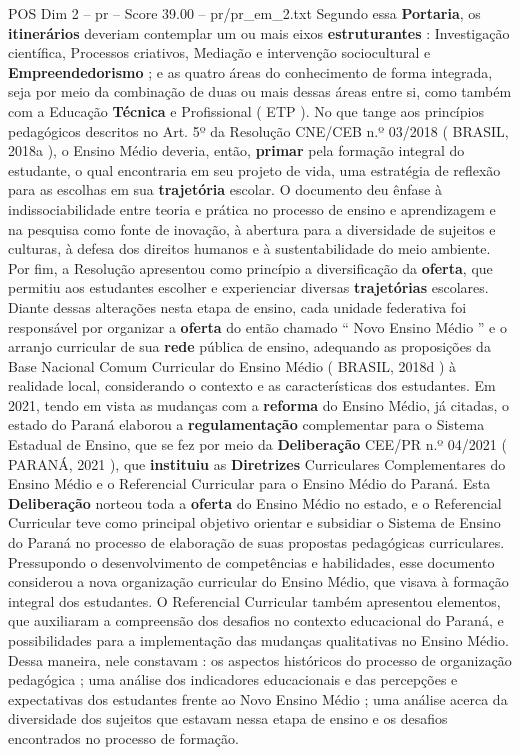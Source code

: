 \begin{textsample}{POS Dim 2 – pr – Score 39.00 – pr/pr\_em\_2.txt}
Segundo essa \textbf{Portaria}, os \textbf{itinerários} deveriam contemplar um ou mais eixos \textbf{estruturantes} : Investigação científica, Processos criativos, Mediação e intervenção sociocultural e \textbf{Empreendedorismo} ; e as quatro áreas do conhecimento de forma integrada, seja por meio da combinação de duas ou mais dessas áreas entre si, como também com a Educação \textbf{Técnica} e Profissional ( ETP ).
No que tange aos princípios pedagógicos descritos no Art. 5º da Resolução CNE/CEB n.º 03/2018 ( BRASIL, 2018a ), o Ensino Médio deveria, então, \textbf{primar} pela formação integral do estudante, o qual encontraria em seu projeto de vida, uma estratégia de reflexão para as escolhas em sua \textbf{trajetória} escolar.
O documento deu ênfase à indissociabilidade entre teoria e prática no processo de ensino e aprendizagem e na pesquisa como fonte de inovação, à abertura para a diversidade de sujeitos e culturas, à defesa dos direitos humanos e à sustentabilidade do meio ambiente.
Por fim, a Resolução apresentou como princípio a diversificação da \textbf{oferta}, que permitiu aos estudantes escolher e experienciar diversas \textbf{trajetórias} escolares.
Diante dessas alterações nesta etapa de ensino, cada unidade federativa foi responsável por organizar a \textbf{oferta} do então chamado “ Novo Ensino Médio ” e o arranjo curricular de sua \textbf{rede} pública de ensino, adequando as proposições da Base Nacional Comum Curricular do Ensino Médio ( BRASIL, 2018d ) à realidade local, considerando o contexto e as características dos estudantes.
Em 2021, tendo em vista as mudanças com a \textbf{reforma} do Ensino Médio, já citadas, o estado do Paraná elaborou a \textbf{regulamentação} complementar para o Sistema Estadual de Ensino, que se fez por meio da \textbf{Deliberação} CEE/PR n.º 04/2021 ( PARANÁ, 2021 ), que \textbf{instituiu} as \textbf{Diretrizes} Curriculares Complementares do Ensino Médio e o Referencial Curricular para o Ensino Médio do Paraná.
Esta \textbf{Deliberação} norteou toda a \textbf{oferta} do Ensino Médio no estado, e o Referencial Curricular teve como principal objetivo orientar e subsidiar o Sistema de Ensino do Paraná no processo de elaboração de suas propostas pedagógicas curriculares.
Pressupondo o desenvolvimento de competências e habilidades, esse documento considerou a nova organização curricular do Ensino Médio, que visava à formação integral dos estudantes.
O Referencial Curricular também apresentou elementos, que auxiliaram a compreensão dos desafios no contexto educacional do Paraná, e possibilidades para a implementação das mudanças qualitativas no Ensino Médio.
Dessa maneira, nele constavam : os aspectos históricos do processo de organização pedagógica ; uma análise dos indicadores educacionais e das percepções e expectativas dos estudantes frente ao Novo Ensino Médio ; uma análise acerca da diversidade dos sujeitos que estavam nessa etapa de ensino e os desafios encontrados no processo de formação.


\end{textsample}
